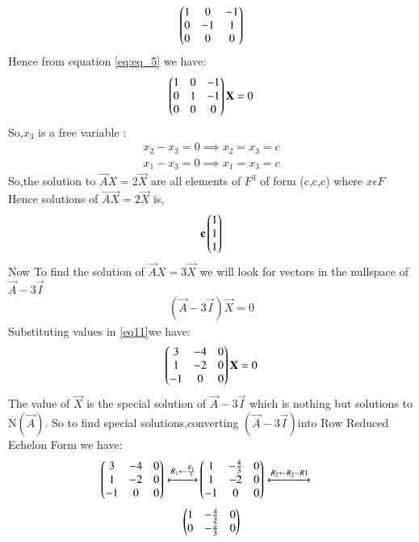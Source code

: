 \documentclass[journal,12pt,twocolumn]{IEEEtran}
\begin{document}
\begin{flushleft}
\begin{align}
\end{align}
\begin{align} \label{eq:eq_5}
    \begin{pmatrix}1&0&-1\\
    0&-1&1\\
    0&0&0\end{pmatrix} 
\end{align}
Hence from equation \eqref{eq:eq_5} we have:
\begin{align}
\begin{pmatrix}1&0&-1\\
0&1&-1\\
0&0&0
\end{pmatrix}
\mathbf X=0
\end{align}
So,$x_3$ is a free variable :\\
\begin{align}
 {x_2}-{x_3}=0 \implies{x_2}={x_3}=c\\
 {x_1}-{x_3}=0 \implies{x_1}={x_3}=c
 \end{align}
 So,the solution to $\vec AX =2\vec X$ are all elements of ${F}^3$ of form (c,c,c) where $x \epsilon F$
 Hence solutions of
 $\vec{AX}=2\vec{X}$ is,
 \begin{align}
 \mathbf{c}
 \begin{pmatrix}
 1\\1\\1
 \end{pmatrix}
\end{align}
 Now To find the solution of $\vec AX=3\vec X$ we will look for vectors in the nullspace of $\vec A-3\vec I$ 
 \begin{align}\label{eq11}
(\vec{A}-3\vec{I})\vec X=0
\end{align}
Substituting values in \eqref{eq11}we have:
\begin{align}
\begin{pmatrix}3&-4&0\\
1&-2&0\\
-1&0&0
\end{pmatrix}\mathbf X=0
\end{align} 
The value of $\vec X$ is the special solution of $\vec A-3\vec I$ which is nothing but solutions to N$(\vec{A})$.
So to find special solutions,converting $(\vec A-3\vec I)$into
Row Reduced Echelon Form we have:
\begin{align}
\begin{pmatrix}3& -4&0\\
1 & -2 & 0\\
-1 & 0 &0
\end{pmatrix}
\xleftrightarrow[]{R_1 \leftarrow \frac{R_1}{3} } 
&
\begin{pmatrix}1&-\frac{4}{3}&0\\
1&-2&0\\
-1&0&0\end{pmatrix}
\xleftrightarrow[]{R_2 \leftarrow R_2-R1} \nonumber 
\end{align}
\begin{align}
    \begin{pmatrix}1&-\frac{4}{3}&0\\
            0&-\frac{2}{3}&0\\
\end{pmatrix}
\end{align}
\end{flushleft}
\end{document}
